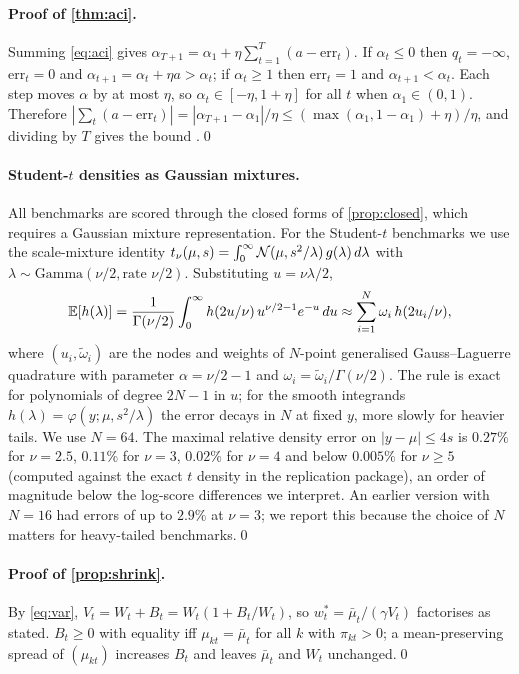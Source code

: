 \paragraph{Proof of \cref{thm:aci}.}
Summing \eqref{eq:aci} gives $\alpha_{T+1}=\alpha_1+\eta\sum_{t=1}^T(a-\mathrm{err}_t)$. If
$\alpha_t\le0$ then $q_t=-\infty$, $\mathrm{err}_t=0$ and $\alpha_{t+1}=\alpha_t+\eta a>\alpha_t$; if
$\alpha_t\ge1$ then $\mathrm{err}_t=1$ and $\alpha_{t+1}<\alpha_t$. Each step moves $\alpha$ by at
most $\eta$, so $\alpha_t\in[-\eta,1+\eta]$ for all $t$ when $\alpha_1\in(0,1)$. Therefore
$|\sum_t(a-\mathrm{err}_t)|=|\alpha_{T+1}-\alpha_1|/\eta\le(\max(\alpha_1,1-\alpha_1)+\eta)/\eta$,
and dividing by $T$ gives the bound \citep[cf.][Prop.~4.1]{gibbs2021adaptive}.\qed

\paragraph{Student-$t$ densities as Gaussian mixtures.}
All benchmarks are scored through the closed forms of \cref{prop:closed}, which requires a Gaussian
mixture representation. For the Student-$t$ benchmarks we use the scale-mixture identity
$t_\nu(\mu,s)=\int_0^\infty\mathcal{N}(\mu,s^2/\lambda)\,g(\lambda)\,d\lambda$ with
$\lambda\sim\mathrm{Gamma}(\nu/2,\text{rate }\nu/2)$. Substituting $u=\nu\lambda/2$,
\begin{equation}
  \mathbb{E}[h(\lambda)]=\frac{1}{\Gamma(\nu/2)}\int_0^\infty h(2u/\nu)\,u^{\nu/2-1}e^{-u}\,du
  \approx\sum_{i=1}^{N}\omega_i\,h(2u_i/\nu),
\end{equation}
where $(u_i,\tilde\omega_i)$ are the nodes and weights of $N$-point generalised Gauss--Laguerre
quadrature with parameter $\alpha=\nu/2-1$ and $\omega_i=\tilde\omega_i/\Gamma(\nu/2)$. The rule is
exact for polynomials of degree $2N-1$ in $u$; for the smooth integrands $h(\lambda)=\varphi(y;\mu,s^2/\lambda)$
the error decays in $N$ at fixed $y$, more slowly for heavier tails. We use $N=64$. The maximal
relative density error on $|y-\mu|\le4s$ is $0.27\%$ for $\nu=2.5$, $0.11\%$ for $\nu=3$, $0.02\%$
for $\nu=4$ and below $0.005\%$ for $\nu\ge5$ (computed against the exact $t$ density in the
replication package), an order of magnitude below the log-score differences we interpret. An
earlier version with $N=16$ had errors of up to $2.9\%$ at $\nu=3$; we report this because the choice
of $N$ matters for heavy-tailed benchmarks.\qed

\paragraph{Proof of \cref{prop:shrink}.}
By \eqref{eq:var}, $V_t=W_t+B_t=W_t(1+B_t/W_t)$, so $w^\ast_t=\bar\mu_t/(\gamma V_t)$ factorises as
stated. $B_t\ge0$ with equality iff $\mu_{kt}=\bar\mu_t$ for all $k$ with $\pi_{kt}>0$; a
mean-preserving spread of $(\mu_{kt})$ increases $B_t$ and leaves $\bar\mu_t$ and $W_t$ unchanged.\qed

